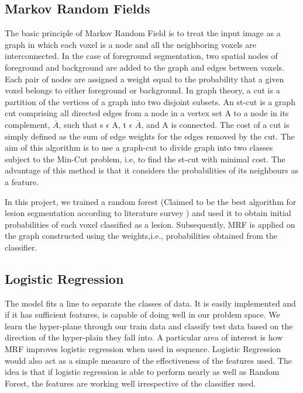 \documentclass{article} %
\begin{document}
\subsection{Markov Random Fields}
The basic principle of Markov Random Field is to treat the input image as a graph in which each voxel is a node and all the neighboring voxels are interconnected. In the case of foreground segmentation, two spatial nodes of foreground and background are added to the graph and edges between voxels. Each pair of nodes are assigned a weight equal to the probability that a given voxel belongs to either foreground or background. In graph theory, a cut is a partition of the vertices of a graph into two disjoint subsets. An st-cut is a graph cut comprising all directed edges from a node in a vertex set A to a node in its complement, $\overline{A}$, such that s $\epsilon$ A, t $\epsilon$ $\overline{A}$, and A is connected. The cost of a cut is simply defined as the sum of edge weights for the edges removed by the cut. The aim of this algorithm is to use a graph-cut to divide graph into two classes subject to the Min-Cut problem, i.e, to find the st-cut with minimal cost. The advantage of this method is that it considers the probabilities of its neighbours as a feature.

In this project, we trained a random forest (Claimed to be the best algorithm for lesion segmentation according to literature survey \cite{garcia2013review}) and used it to obtain initial probabilities of each voxel classified as a lesion. Subsequently, MRF is applied on the graph constructed using the weights,i.e., probabilities obtained from the classifier.

\subsection{Logistic Regression} 
The model fits a line to separate the classes of data. It is easily implemented and if it has sufficient features, is capable of doing well in our problem space. We learn the hyper-plane through our train data and classify test data based on the direction of the hyper-plain they fall into. A particular area of interest is how MRF improves logistic regression when used in sequence. Logistic Regression would also act as a simple measure of the effectiveness of the features used. The idea is that if logistic regression is able to perform nearly as well as Random Forest, the features are working well irrespective of the classifier used.  


\end{document}
